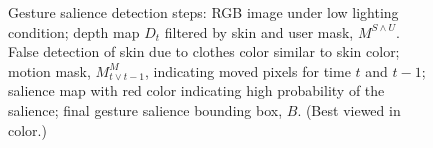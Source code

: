 \documentclass{acm_proc_article-sp}
\begin{document}
\begin{figure}[tb]
\centering
\hspace{-0.6em}%
\caption{Gesture salience detection steps:  RGB image under low lighting condition;
 depth map $D_t$ filtered by skin and user mask, $M^{S\wedge U}$. False detection of skin due to
clothes color similar to skin color;  motion mask,  $M_{t\vee t-1}^M$, indicating moved pixels for time $t$ and $t-1$;
 salience map with red color indicating high probability of the salience; 
 final gesture salience bounding box, $B$. (Best viewed in
color.)}
\label{fig:gesture-salience}
\end{figure}
\end{document}
